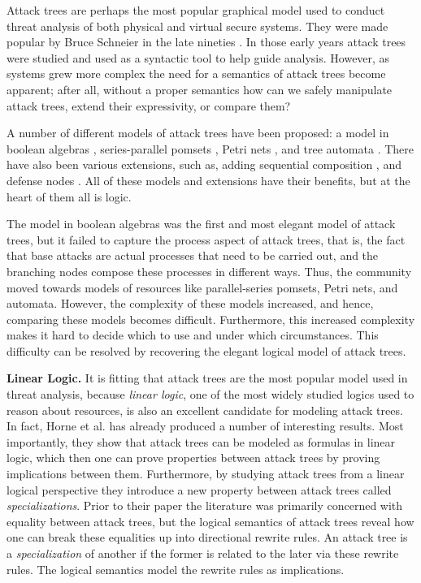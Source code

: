 Attack trees are perhaps the most popular graphical model used to
conduct threat analysis of both physical and virtual secure
systems. They were made popular by Bruce Schneier in the late nineties
\cite{Schneier:1999}.  In those early years attack trees were studied
and used as a syntactic tool to help guide analysis.  However, as
systems grew more complex the need for a semantics of attack trees
become apparent; after all, without a proper semantics how can we
safely manipulate attack trees, extend their expressivity, or compare
them?

A number of different models of attack trees have been proposed: a
model in boolean algebras
\cite{Kordy:2014,Kordy:2012,Pietre-Cambacedes:2010}, series-parallel
pomsets \cite{Mauw:2006}, Petri nets \cite{McDermott:2001}, and tree
automata \cite{Camtepe:2007}.  There have also been various
extensions, such as, adding sequential composition \cite{Jhawar:2015},
and defense nodes \cite{Kordy:2011,Kordy:2012}.  All of these models
and extensions have their benefits, but at the heart of them all is
logic.

The model in boolean algebras was the first and most elegant model of
attack trees, but it failed to capture the process aspect of attack
trees, that is, the fact that base attacks are actual processes that
need to be carried out, and the branching nodes compose these
processes in different ways.  Thus, the community moved towards models
of resources like parallel-series pomsets, Petri nets, and automata.
However, the complexity of these models increased, and hence,
comparing these models becomes difficult. Furthermore, this increased
complexity makes it hard to decide which to use and under which
circumstances.  This difficulty can be resolved by recovering the
elegant logical model of attack trees.

\textbf{Linear Logic.}  It is fitting that attack trees are the most
popular model used in threat analysis, because \emph{linear logic},
one of the most widely studied logics used to reason about resources,
is also an excellent candidate for modeling attack trees.  In fact,
Horne et al.\cite{horne2017semantics} has already produced a number of
interesting results.  Most importantly, they show that attack trees
can be modeled as formulas in linear logic, which then one can prove
properties between attack trees by proving implications between them.
Furthermore, by studying attack trees from a linear logical
perspective they introduce a new property between attack trees called
\emph{specializations}.  Prior to their paper the literature was
primarily concerned with equality between attack trees, but the
logical semantics of attack trees reveal how one can break these
equalities up into directional rewrite rules.  An attack tree is a
\emph{specialization} of another if the former is related to the later
via these rewrite rules.  The logical semantics model the rewrite
rules as implications.


